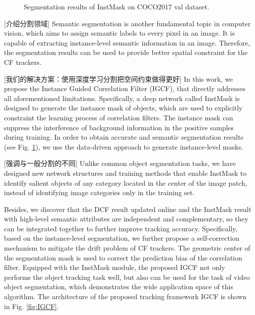 \documentclass[review]{elsarticle}
\begin{document}
\begin{CJK*}{UTF8}{gbsn}
\begin{figure}
    \caption{Segmentation results of InstMask on COCO2017 \cite{Lin2014MicrosoftCC} val dataset.}
    \label{fig:InstMask}
\end{figure}

[介绍分割领域] Semantic segmentation \cite{Pinheiro2015LearningTS} is another fundamental topic in computer vision, which aims to assign semantic labels to every pixel in an image. It is capable of extracting instance-level semantic information in an image. Therefore, the segmentation results can be used to provide better spatial constraint for the CF trackers.

[我们的解决方案：使用深度学习分割把空间约束做得更好] In this work, we propose the Instance Guided Correlation Filter (IGCF), that directly addresses all aforementioned limitations. Specifically, a deep network called InstMask is designed to generate the instance mask of objects, which are used to explicitly constraint the learning process of correlation filters. The instance mask can suppress the interference of background information in the positive samples during training. In order to obtain accurate and semantic segmentation results (see Fig. \ref{fig:InstMask}), we use the data-driven approach to generate instance-level masks. 

[强调与一般分割的不同] Unlike common object segmentation tasks, we have designed new network structures and training methods that enable InstMask to identify salient objects of any category located in the center of the image patch, instead of identifying image categories only in the training set. 

Besides, we discover that the DCF result updated online and the InstMask result with high-level semantic attributes are independent and complementary, so they can be integrated together to further improve tracking accuracy. Specifically, based on the instance-level segmentation, we further propose a self-correction mechanism to mitigate the drift problem of CF trackers. The geometric center of the segmentation mask is used to correct the prediction bias of the correlation filter. Equipped with the InstMask module, the proposed IGCF not only performs the object tracking task well, but also can be used for the task of video object segmentation, which demonstrates the wide application space of this algorithm. The architecture of the proposed tracking framework IGCF is shown in Fig. \ref{fig:IGCF}.


\end{CJK*}
\end{document}
